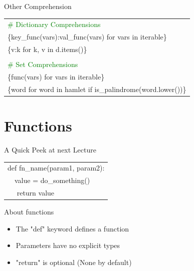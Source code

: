 \documentclass[serif, aspectratio=169]{beamer}
\newcommand{\tgreen}[1]{\textcolor{green}{#1}}
\newcommand{\tpurple}[1]{\textcolor{purple!50}{#1}}
\newenvironment{CLI} %
    {
    \noindent
    \ttfamily 
    \footnotesize
    \begin{tcolorbox}[colback=gray!150,colframe=black]
    \color{white}
    \begin{tabular}{p{4.5cm}p{7.5cm}}
    }
    { 
    \end{tabular}
    \end{tcolorbox}
    }
\newenvironment{exoframe}
    {
    \setbeamercolor{background canvas}{bg=hkustblue}
    \renewcommand\thefootnote{\textcolor{white}{\arabic{footnote}}}
    \color{white}
    \setbeamercolor{structure}{fg=white}
    \begin{frame}
    }
    {
    \end{frame}
    }
\begin{document}
\begin{frame}{Other Comprehension}
    \begin{CLI}
        \tgreen{\# Dictionary Comprehensions} & \\
        \multicolumn{2}{l}{\{key\_func(vars):val\_func(vars) for vars in iterable\}} \\
        \multicolumn{2}{l}{\{v:k for k, v in d.items()\}} \\
        & \\
        \tgreen{\# Set Comprehensions} & \\
        \multicolumn{2}{l}{\{func(vars) for vars in iterable\}} \\
        \multicolumn{2}{l}{\{word for word in hamlet if is\_palindrome(word.lower())\}} \\ 
    \end{CLI}
\end{frame}


\section{Functions}

\begin{frame}{A Quick Peek at next Lecture}
    \begin{CLI}
        \multicolumn{2}{l}{\tpurple{def} fn\_name(param1, param2):} \\
        ~~value = do\_something() & \\
        ~~ \tpurple{return} value & \\
    \end{CLI}
    \begin{block}{About functions}
        \begin{itemize}
            \item The "def" keyword defines a function
            \item Parameters have no explicit types
            \item "return" is optional (None by default)
        \end{itemize}
    \end{block}
\end{frame}
\end{document}
